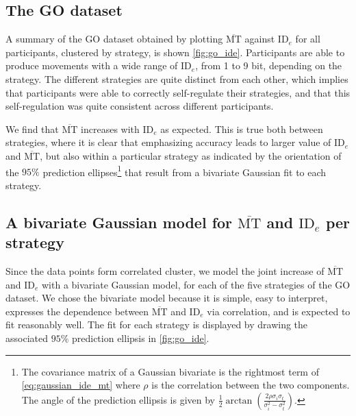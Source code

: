 \documentclass[12pt,a4paper]{article}
\newcommand{\mmt}{\ensuremath{\overline{\text{MT}}}\xspace}
\newcommand{\ide}{\ensuremath{{\text{ID}_e}}\xspace}
\begin{document}
\subsection{The GO dataset}
A summary of the GO dataset obtained by plotting \mmt against \ide for all participants, clustered by strategy, is shown \autoref{fig:go_ide}.
Participants are able to produce movements with a wide range of \ide, from 1 to 9 bit, depending on the strategy.
The different strategies are quite distinct from each other, which implies that participants were able to correctly self-regulate their strategies, and that this self-regulation was quite consistent across different participants.

We find that \mmt increases with \ide as expected. This is true both between strategies, where it is clear that emphasizing accuracy leads to larger value of \ide and \mmt, but also within a particular strategy as indicated by the orientation of the $95\%$ prediction ellipses\footnote{The covariance matrix of a Gaussian bivariate is the rightmost term of \autoref{eq:gaussian_ide_mt} where $\rho$ is the correlation between the two components. The angle of the prediction ellipsis is given by $\frac{1}{2} \arctan \left( \frac{2\rho \sigma_i\sigma_t}{\sigma_i^2 - \sigma_t^2} \right) $.} that result from a bivariate Gaussian fit to each strategy.


\subsection{A bivariate Gaussian model for \mmt and \ide per strategy}
Since the data points form correlated cluster, we model the joint increase of \mmt and \ide with a bivariate Gaussian model, for each of the five strategies of the GO dataset. We chose the bivariate model because it is simple, easy to interpret, expresses the dependence between \mmt and \ide via correlation, and is expected to fit reasonably well. The fit for each strategy is displayed by drawing the associated $95\%$ prediction ellipsis in \autoref{fig:go_ide}.
\end{document}
